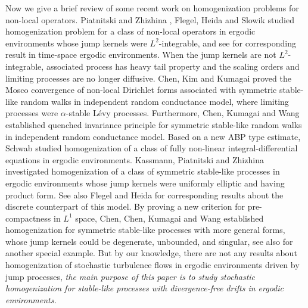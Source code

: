 \documentclass[11pt,draft, reqno]{amsart}
\theoremstyle{definition}
\numberwithin{equation}{section}
\begin{document}
Now we give a brief review of some recent work on
homogenization problems
for non-local operators.
Piatnitski and Zhizhina \cite{PZ}, Flegel, Heida and Slowik \cite{FHS}
studied homogenization problem
for a class of non-local operators in ergodic environments whose jump kernels were $L^2$-integrable, and see
\cite{PZ1} for corresponding result in time-space ergodic environments.
When the jump kernels are not $L^2$-integrable, associated process has heavy tail property and
the scaling orders and limiting processes are no longer diffusive.
Chen, Kim and Kumagai \cite{CKK} proved the Mosco convergence of non-local Dirichlet forms associated with
symmetric stable-like random walks in independent random
conductance model, where limiting processes
were $\alpha$-stable L\'evy processes. Furthermore, Chen, Kumagai and Wang \cite{CKW} established quenched invariance
principle for symmetric stable-like random walks in independent random conductance model.
Based on a new ABP type estimate, Schwab \cite{S} studied
homogenization of a class of fully
non-linear integral-differential equations in ergodic environments.
Kassmann, Piatnitski and Zhizhina \cite{KPZ} investigated
homogenization of a class of symmetric stable-like processes in
 ergodic environments whose jump kernels were uniformly elliptic and
 having product form. See also Flegel and Heida \cite{FH} for corresponding results about
 the discrete counterpart of this model.
 By proving a new criterion for pre-compactness in $L^1$ space,
 Chen, Chen, Kumagai and Wang \cite{CCKW1} established homogenization for symmetric
 stable-like processes with more general forms, whose jump kernels could be degenerate, unbounded,
 and singular, see also \cite{CCKW} for another special example. But by our knowledge, there are not
 any results about homogenization of stochastic turbulence flows in ergodic environments driven by
 jump processes,
 \emph{the main purpose of this paper is to study  stochastic homogenization for stable-like processes with divergence-free drifts in
ergodic environments.}




\end{document}
